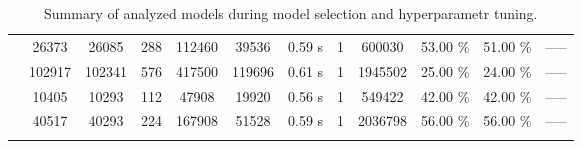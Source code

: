 \begin{table}[ht]
\begin{tabular}{ |c|c|c|c|c|c|c|c|c|c| }
 & 26373 & 26085 & 288 & 112460 & 39536 & 0.59 s & 1 & 600030 & 53.00 \% & 51.00 \% & ----- \\
 & 102917 & 102341 & 576 & 417500 & 119696 & 0.61 s & 1 & 1945502 & 25.00 \% & 24.00 \% & ----- \\
 & 10405 & 10293 & 112 & 47908 & 19920 & 0.56 s & 1 & 549422 & 42.00 \% & 42.00 \% & ----- \\
 & 40517 & 40293 & 224 & 167908 & 51528 & 0.59 s & 1 & 2036798 & 56.00 \% & 56.00 \% & ----- \\
\hline
\caption{Summary of analyzed models during model selection and hyperparametr tuning.}
\label{table1}
\end{tabular}
\end{table}
